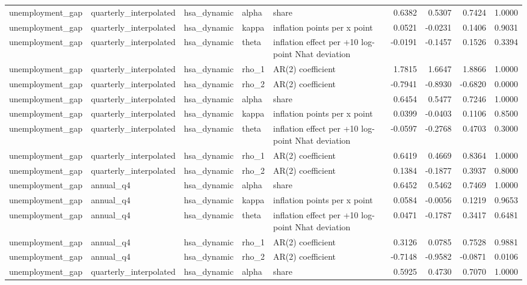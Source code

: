 \begin{tabular}{lllllrrrr}
unemployment\_gap & quarterly\_interpolated & hsa\_dynamic & alpha & share & 0.6382 & 0.5307 & 0.7424 & 1.0000 \\
unemployment\_gap & quarterly\_interpolated & hsa\_dynamic & kappa & inflation points per x point & 0.0521 & -0.0231 & 0.1406 & 0.9031 \\
unemployment\_gap & quarterly\_interpolated & hsa\_dynamic & theta & inflation effect per +10 log-point Nhat deviation & -0.0191 & -0.1457 & 0.1526 & 0.3394 \\
unemployment\_gap & quarterly\_interpolated & hsa\_dynamic & rho\_1 & AR(2) coefficient & 1.7815 & 1.6647 & 1.8866 & 1.0000 \\
unemployment\_gap & quarterly\_interpolated & hsa\_dynamic & rho\_2 & AR(2) coefficient & -0.7941 & -0.8930 & -0.6820 & 0.0000 \\
unemployment\_gap & quarterly\_interpolated & hsa\_dynamic & alpha & share & 0.6454 & 0.5477 & 0.7246 & 1.0000 \\
unemployment\_gap & quarterly\_interpolated & hsa\_dynamic & kappa & inflation points per x point & 0.0399 & -0.0403 & 0.1106 & 0.8500 \\
unemployment\_gap & quarterly\_interpolated & hsa\_dynamic & theta & inflation effect per +10 log-point Nhat deviation & -0.0597 & -0.2768 & 0.4703 & 0.3000 \\
unemployment\_gap & quarterly\_interpolated & hsa\_dynamic & rho\_1 & AR(2) coefficient & 0.6419 & 0.4669 & 0.8364 & 1.0000 \\
unemployment\_gap & quarterly\_interpolated & hsa\_dynamic & rho\_2 & AR(2) coefficient & 0.1384 & -0.1877 & 0.3937 & 0.8000 \\
unemployment\_gap & annual\_q4 & hsa\_dynamic & alpha & share & 0.6452 & 0.5462 & 0.7469 & 1.0000 \\
unemployment\_gap & annual\_q4 & hsa\_dynamic & kappa & inflation points per x point & 0.0584 & -0.0056 & 0.1219 & 0.9653 \\
unemployment\_gap & annual\_q4 & hsa\_dynamic & theta & inflation effect per +10 log-point Nhat deviation & 0.0471 & -0.1787 & 0.3417 & 0.6481 \\
unemployment\_gap & annual\_q4 & hsa\_dynamic & rho\_1 & AR(2) coefficient & 0.3126 & 0.0785 & 0.7528 & 0.9881 \\
unemployment\_gap & annual\_q4 & hsa\_dynamic & rho\_2 & AR(2) coefficient & -0.7148 & -0.9582 & -0.0871 & 0.0106 \\
unemployment\_gap & quarterly\_interpolated & hsa\_dynamic & alpha & share & 0.5925 & 0.4730 & 0.7070 & 1.0000 \\

\end{tabular}
